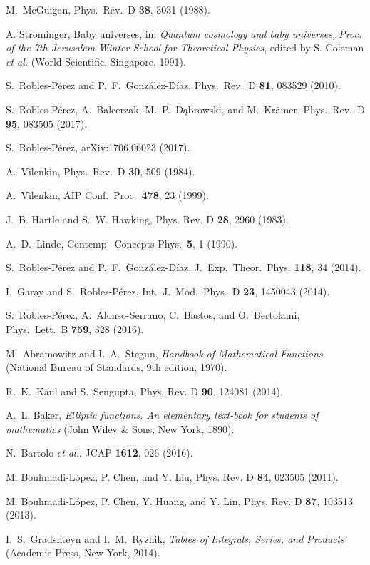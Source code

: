 \documentclass[aps,nofootinbib,prd,superscriptaddress,eqsecnum,showpacs,showkeys,preprintnumbers,altaffilletter]{revtex4}
\begin{document}
\begin{thebibliography}{99}
  M.~McGuigan,
  Phys.\ Rev.\ D {\bf 38}, 3031 (1988).

A. Strominger,
Baby universes, in: {\it Quantum cosmology and baby universes, Proc. of the 7th Jerusalem Winter School for Theoretical Physics},
edited by S. Coleman {\it et al.} (World Scientific, Singapore, 1991). 

  S.~Robles-P\'erez and P.~F.~Gonz\'alez-D\'iaz,
  Phys.\ Rev.\ D {\bf 81}, 083529 (2010).
  
S.~Robles-P\'erez, A.~Balcerzak, M.~P.~D\k{a}browski, and M.~Kr\"amer,
Phys.\ Rev.\ D {\bf 95}, 083505 (2017).

S.~Robles-P\'erez,
 arXiv:1706.06023 (2017).

  A.~Vilenkin,
  Phys.\ Rev.\ D {\bf 30}, 509 (1984).

  A.~Vilenkin,
  AIP Conf.\ Proc.\  {\bf 478}, 23 (1999).
  
 J.~B. Hartle and S.~W. Hawking,
  Phys. Rev. D {\bf 28}, 2960 (1983).
  
  A.~D.~Linde,
  Contemp.\ Concepts Phys.\  {\bf 5}, 1 (1990).
  
S.~Robles-P\'erez and P.~F.~Gonz\'alez-D\'iaz,
J.~Exp.~Theor.~Phys. {\bf 118}, 34 (2014).

  I.~Garay and S.~Robles-P\'erez,
  Int.\ J.\ Mod.\ Phys.\ D {\bf 23}, 1450043 (2014).

  S.~Robles-P\'erez, A.~Alonso-Serrano, C.~Bastos, and O.~Bertolami,
  Phys.\ Lett.\ B {\bf 759}, 328 (2016).

M.~Abramowitz and I.~A.~Stegun, 
{\em Handbook of Mathematical Functions}
(National Bureau of Standards, 9th edition, 1970).

R.~K.~Kaul and S.~Sengupta,
Phys. Rev. D {\bf 90}, 124081 (2014).

A.~L. Baker,
  \emph{Elliptic functions. An elementary text-book for students of mathematics} 
  (John Wiley \& Sons, New York, 1890).

  N.~Bartolo {\it et al.},
  JCAP {\bf 1612}, 026 (2016).
  
M. Bouhmadi-L\'opez, P. Chen, and Y. Liu, 
Phys. Rev. D {\bf 84}, 023505 (2011). 

M. Bouhmadi-L\'opez, P. Chen, Y. Huang, and Y. Lin, 
Phys. Rev. D {\bf 87}, 103513 (2013).

I.~S.~Gradshteyn and I.~M.~Ryzhik, 
{\it Tables of Integrals, Series, and Products} 
(Academic Press, New York, 2014).

\end{thebibliography}
\end{document}
